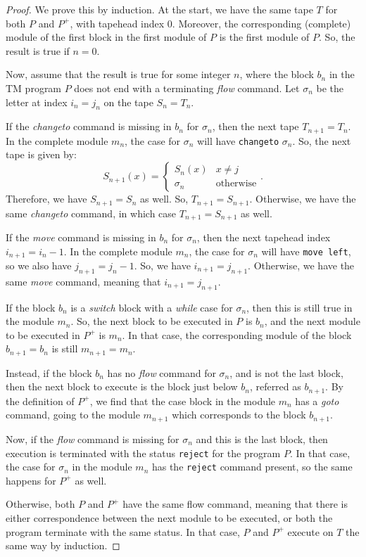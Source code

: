\documentclass{article}
\theoremstyle{definition}
\theoremstyle{plain}
\begin{document}
\begin{proof}
    We prove this by induction. At the start, we have the same tape $T$ for both $P$ and $P^+$, with tapehead index 0. Moreover, the corresponding (complete) module of the first block in the first module of $P$ is the first module of $P$. So, the result is true if $n = 0$. 
    
    Now, assume that the result is true for some integer $n$, where the block $b_n$ in the TM program $P$ does not end with a terminating \textit{flow} command. Let $\sigma_n$ be the letter at index $i_n = j_n$ on the tape $S_n = T_n$.
    
    If the \textit{changeto} command is missing in $b_n$ for $\sigma_n$, then the next tape $T_{n+1} = T_n$. In the complete module $m_n$, the case for $\sigma_n$ will have \texttt{changeto} $\sigma_n$. So, the next tape is given by:
    \[S_{n+1}(x) = \begin{cases}
        S_n(x) & x \neq j \\
        \sigma_n & \text{otherwise}
    \end{cases}.\]
    Therefore, we have $S_{n+1} = S_n$ as well. So, $T_{n+1} = S_{n+1}$. Otherwise, we have the same \textit{changeto} command, in which case $T_{n+1} = S_{n+1}$ as well.

    If the \textit{move} command is missing in $b_n$ for $\sigma_n$, then the next tapehead index $i_{n+1} = i_n - 1$. In the complete module $m_n$, the case for $\sigma_n$ will have \texttt{move left}, so we also have $j_{n+1} = j_n - 1$. So, we have $i_{n+1} = j_{n+1}$. Otherwise, we have the same \textit{move} command, meaning that $i_{n+1} = j_{n+1}$.

    If the block $b_n$ is a \textit{switch} block with a \textit{while} case for $\sigma_n$, then this is still true in the module $m_n$. So, the next block to be executed in $P$ is $b_n$, and the next module to be executed in $P^+$ is $m_n$. In that case, the corresponding module of the block $b_{n+1} = b_n$ is still $m_{n+1} = m_n$.
    
    Instead, if the block $b_n$ has no \textit{flow} command for $\sigma_n$, and is not the last block, then the next block to execute is the block just below $b_n$, referred as $b_{n+1}$. By the definition of $P^+$, we find that the case block in the module $m_n$ has a \textit{goto} command, going to the module $m_{n+1}$ which corresponds to the block $b_{n+1}$. 
    
    Now, if the \textit{flow} command is missing for $\sigma_n$ and this is the last block, then execution is terminated with the status \texttt{reject} for the program $P$. In that case, the case for $\sigma_n$ in the module $m_n$ has the \texttt{reject} command present, so the same happens for $P^+$ as well. 
    
    Otherwise, both $P$ and $P^+$ have the same flow command, meaning that there is either correspondence between the next module to be executed, or both the program terminate with the same status. In that case, $P$ and $P^+$ execute on $T$ the same way by induction.
\end{proof}
\end{document}
